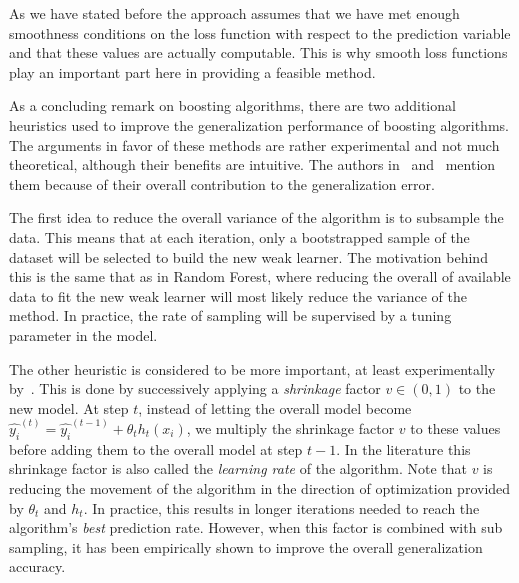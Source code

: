 As we have stated before the approach assumes that we have met enough smoothness conditions on the loss function with respect to the prediction variable
and that these values are actually computable. 
This is why smooth loss functions play an important part here in providing a feasible method.





As a concluding remark on boosting algorithms, there are two additional heuristics used to improve the generalization performance of boosting algorithms. 
The arguments in favor of these methods are rather experimental and not much theoretical, although their benefits are intuitive. 
The authors in~\cite{hastie-elemstatslearn} and~\cite{bishop-patternRecognition} mention them because of their overall contribution to the generalization error.

The first idea to reduce the overall variance of the algorithm is to subsample the data. 
This means that at each iteration, only a bootstrapped sample of the dataset will be selected to build the new weak learner. 
The motivation behind this is the same that as in Random Forest, where reducing the overall of available data to fit the new weak learner will most likely reduce the variance of the method. 
In practice, the rate of sampling will be supervised by a tuning parameter in the model.

The other heuristic is considered to be more important, at least experimentally by~\cite{hastie-elemstatslearn}. 
This is done by successively applying a \textit{shrinkage} factor $v \in (0,1)$ to the new model. 
At step $t$, instead of letting the overall model become $ \hat{y_i}^{(t)} = \hat{y_i}^{(t-1)} + \theta_t h_t(x_i) $, we multiply the shrinkage factor $v$ to these values before adding them to the overall model at step $t-1$. 
In the literature this shrinkage factor is also called the \textit{learning rate} of the algorithm. 
Note that $v$ is reducing the movement of the algorithm in the direction of optimization provided by $\theta_t$ and $h_t$. In practice, this results in longer iterations needed to reach the algorithm's \textit{best} prediction rate. However, when this factor is combined with sub sampling, it has been empirically shown to improve the overall generalization accuracy.


